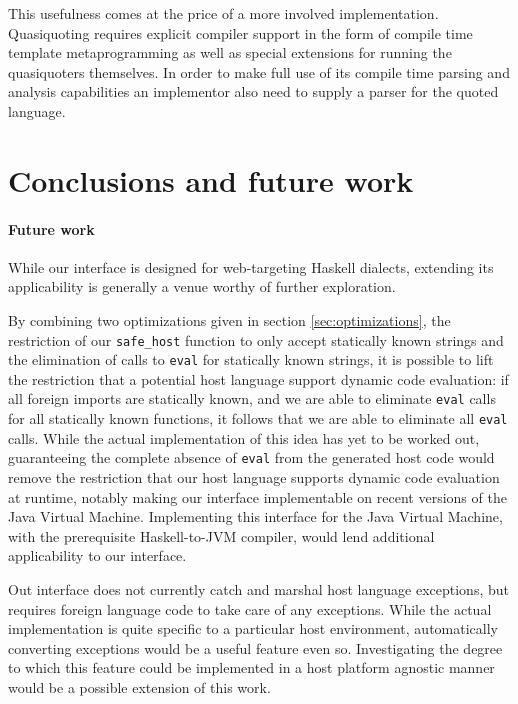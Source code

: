 \documentclass[preprint]{sigplanconf}
\begin{document}
This usefulness comes at the price of a more involved implementation.
Quasiquoting requires explicit compiler support in the form of
compile time template metaprogramming as well as special extensions for running
the quasiquoters themselves.
In order to make full use of its compile time parsing and analysis capabilities
an implementor also need to supply a parser for the quoted language.

\section{Conclusions and future work}
\label{sec:conclusion}
\paragraph{Future work}
While our interface is designed for web-targeting Haskell dialects, extending
its applicability is generally a venue worthy of further exploration.

By combining two optimizations given in section \ref{sec:optimizations},
the restriction of our \lstinline!safe_host! function to only accept statically
known strings and the elimination of calls to \lstinline!eval! for statically
known strings, it is possible to lift the restriction that a potential
host language support dynamic code evaluation:
if all foreign imports are statically known,
and we are able to eliminate \lstinline!eval! calls for all statically known
functions, it follows that we are able to eliminate all \lstinline!eval! calls.
While the actual implementation of this idea has yet to be worked out,
guaranteeing the complete absence of \lstinline!eval! from the generated host
code would remove the restriction that our host language supports dynamic code
evaluation at runtime, notably making our interface implementable on
recent versions of the Java Virtual Machine.
Implementing this interface for the Java Virtual Machine, with the
prerequisite Haskell-to-JVM compiler, would lend additional applicability to
our interface.

Out interface does not currently catch and marshal host language
exceptions, but requires foreign language code to take care of any exceptions.
While the actual implementation is quite specific to a particular
host environment, automatically converting exceptions would be a useful feature
even so. Investigating the degree to which this feature could be implemented
in a host platform agnostic manner would be a possible extension of this work.
\end{document}
